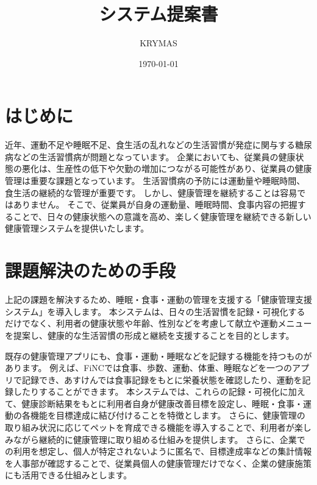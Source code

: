 \documentclass[uplatex,dvipdfmx]{jlreq}
\begin{document}
\title{システム提案書}

\author{KRYMAS}

\date{\today}

\maketitle

\setcounter{tocdepth}{3}
\tableofcontents
\clearpage

\section{はじめに}

近年、運動不足や睡眠不足、食生活の乱れなどの生活習慣が発症に関与する糖尿病などの生活習慣病が問題となっています\cite{bib:healthsurvey}。
企業においても、従業員の健康状態の悪化は、生産性の低下や欠勤の増加につながる可能性があり、従業員の健康管理は重要な課題となっています\cite{bib:productivity}。
生活習慣病の予防には運動量や睡眠時間、食生活の継続的な管理が重要です\cite{bib:health}。
しかし、健康管理を継続することは容易ではありません。
そこで、従業員が自身の運動量、睡眠時間、食事内容の把握することで、日々の健康状態への意識を高め、楽しく健康管理を継続できる新しい健康管理システムを提供いたします。



\section{課題解決のための手段}
上記の課題を解決するため、睡眠・食事・運動の管理を支援する「健康管理支援システム」を導入します。
本システムは、日々の生活習慣を記録・可視化するだけでなく、利用者の健康状態や年齢、性別などを考慮して献立や運動メニューを提案し、健康的な生活習慣の形成と継続を支援することを目的とします。

既存の健康管理アプリにも、食事・運動・睡眠などを記録する機能を持つものがあります。
例えば、FiNCでは食事、歩数、運動、体重、睡眠などを一つのアプリで記録でき、あすけんでは食事記録をもとに栄養状態を確認したり、運動を記録したりすることができます。
本システムでは、これらの記録・可視化に加えて、健康診断結果をもとに利用者自身が健康改善目標を設定し、睡眠・食事・運動の各機能を目標達成に結び付けることを特徴とします。
さらに、健康管理の取り組み状況に応じてペットを育成できる機能を導入することで、利用者が楽しみながら継続的に健康管理に取り組める仕組みを提供します。
さらに、企業での利用を想定し、個人が特定されないように匿名で、目標達成率などの集計情報を人事部が確認することで、従業員個人の健康管理だけでなく、企業の健康施策にも活用できる仕組みとします。
\end{document}
